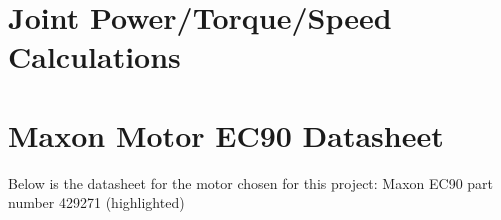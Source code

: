 \appendix

\chapter{Joint Power/Torque/Speed Calculations}
\label{apx:JointPowerTorqueSpeedCalcs}



\chapter{Maxon Motor EC90 Datasheet}
\label{apx:EC90Datasheet}
Below is the datasheet for the motor chosen for this project: Maxon EC90 part number 429271 (highlighted)


